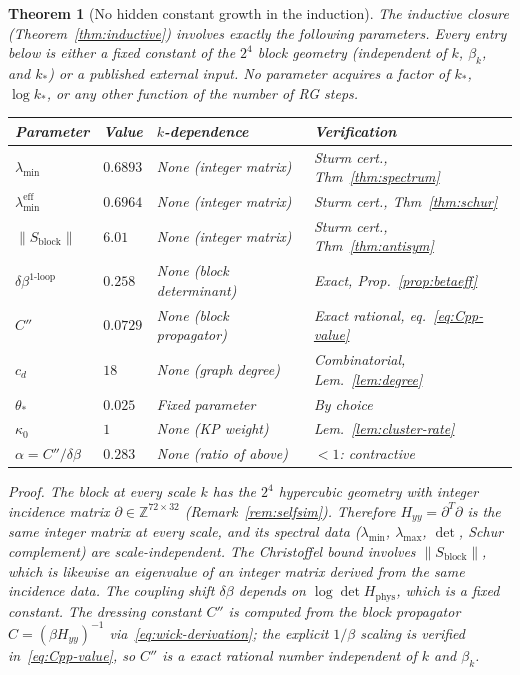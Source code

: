 \documentclass[11pt]{article}
\newtheorem{theorem}{Theorem}[section]
\theoremstyle{definition}
\newcommand{\Z}{\mathbb{Z}}
\begin{document}
\begin{theorem}[No hidden constant growth in the induction]%
\label{thm:no-hidden-growth}
The inductive closure \textup{(}Theorem~\ref{thm:inductive}\textup{)}
involves exactly the following parameters.
Every entry below is either a fixed constant of the $2^4$ block
geometry \textup{(}independent of $k$, $\beta_k$, and $k_*$\textup{)}
or a published external input.
No parameter acquires a factor of $k_*$, $\log k_*$, or any other
function of the number of RG steps.

\begin{center}
\renewcommand{\arraystretch}{1.15}
\begin{tabular}{llll}
\toprule
\textbf{Parameter} & \textbf{Value} & \textbf{$k$-dependence} &
\textbf{Verification}\\
\midrule
$\lambda_{\min}$ & $0.6893$ & None (integer matrix) &
Sturm cert., Thm~\ref{thm:spectrum}\\
$\lambda_{\min}^{\mathrm{eff}}$ & $0.6964$ & None (integer matrix) &
Sturm cert., Thm~\ref{thm:schur}\\
$\|S_{\mathrm{block}}\|$ & $6.01$ & None (integer matrix) &
Sturm cert., Thm~\ref{thm:antisym}\\
$\delta\beta^{1\text{-loop}}$ & $0.258$ & None (block determinant) &
Exact, Prop.~\ref{prop:betaeff}\\
$C''$ & $0.0729$ & None (block propagator) &
Exact rational, eq.~\eqref{eq:Cpp-value}\\
$c_d$ & $18$ & None (graph degree) &
Combinatorial, Lem.~\ref{lem:degree}\\
$\theta_*$ & $0.025$ & Fixed parameter & By choice\\
$\kappa_0$ & $1$ & None (KP weight) &
Lem.~\ref{lem:cluster-rate}\\
$\alpha=C''/\delta\beta$ & $0.283$ & None (ratio of above) &
$<1$: contractive\\
\bottomrule
\end{tabular}
\end{center}

\emph{Proof.}
The block at every scale $k$ has the $2^4$ hypercubic
geometry with integer incidence matrix $\partial\in\Z^{72\times 32}$
\textup{(}Remark~\ref{rem:selfsim}\textup{)}.
Therefore $H_{yy}=\partial^T\partial$ is the same integer matrix
at every scale, and its spectral data
\textup{(}$\lambda_{\min}$, $\lambda_{\max}$, $\det$, Schur complement\textup{)}
are scale-independent.
The Christoffel bound involves $\|S_{\mathrm{block}}\|$, which
is likewise an eigenvalue of an integer matrix derived from the
same incidence data.
The coupling shift $\delta\beta$ depends on $\log\det H_{\mathrm{phys}}$,
which is a fixed constant.
The dressing constant $C''$ is computed from the block propagator
$C=(\beta H_{yy})^{-1}$ via~\eqref{eq:wick-derivation};
the explicit $1/\beta$ scaling is verified in~\eqref{eq:Cpp-value},
so $C''$ is a exact rational number independent of $k$ and $\beta_k$.


\end{theorem}
\end{document}
